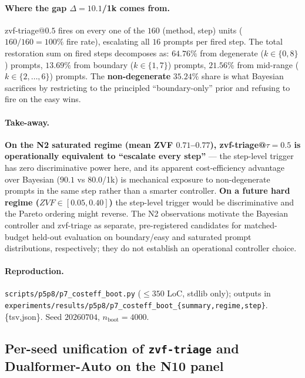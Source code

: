\paragraph{Where the gap $\Delta{=}10.1$/1k comes from.}
zvf-triage@$0.5$ fires on every one of the $160$ (method, step)
units ($160/160 = 100\%$ fire rate), escalating all $16$ prompts
per fired step. The total restoration sum on fired steps decomposes
as: $64.76\%$ from degenerate ($k{\in}\{0,8\}$) prompts,
$13.69\%$ from boundary ($k{\in}\{1,7\}$) prompts, $21.56\%$
from mid-range ($k{\in}\{2,\ldots,6\}$) prompts. The
\textbf{non-degenerate} $35.24\%$ share is what Bayesian
sacrifices by restricting to the principled ``boundary-only''
prior and refusing to fire on the easy wins.

\paragraph{Take-away.}
\textbf{On the N2 saturated regime (mean ZVF $0.71$--$0.77$),
zvf-triage@$\tau{=}0.5$ is operationally equivalent to
``escalate every step''} --- the step-level trigger has zero
discriminative power here, and its apparent cost-efficiency
advantage over Bayesian ($90.1$ vs $80.0$/1k) is mechanical
exposure to non-degenerate prompts in the same step rather than
a smarter controller. \textbf{On a future hard regime
($ZVF \in [0.05, 0.40]$)} the step-level trigger would be
discriminative and the Pareto ordering might reverse. The
N2 observations motivate the Bayesian controller and zvf-triage as separate,
pre-registered candidates for matched-budget held-out evaluation on
boundary/easy and saturated prompt distributions, respectively; they do not
establish an operational controller choice.

\paragraph{Reproduction.}
\texttt{scripts/p5p8/p7\_costeff\_boot.py} ($\leq 350$ LoC,
stdlib only); outputs in
\texttt{experiments/results/p5p8/p7\_costeff\_boot\_\{summary,regime,step\}}.\{tsv,json\}.
Seed $20260704$, $n_{\mathrm{boot}}{=}4000$.

\subsection{Per-seed unification of \texttt{zvf-triage} and Dualformer-Auto
on the N10 panel}
\label{sec:p7-controller-n10unif}

